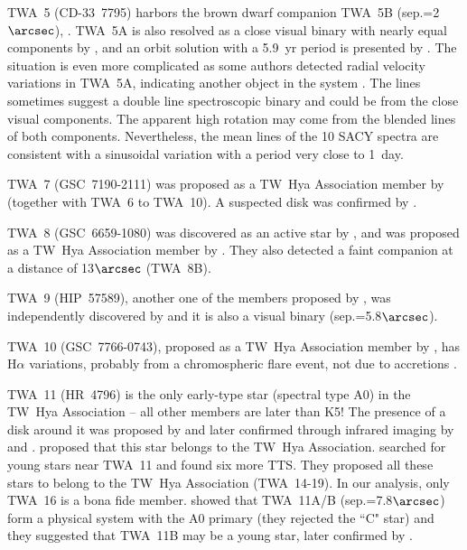 \documentclass[11pt,twoside]{book}
\begin{document}
TWA~5 (CD-33~7795) harbors
the brown dwarf companion  TWA~5B (sep.=2$\arcsec$), \citep{lowrance99, webb99}.
TWA~5A is also resolved as a close visual binary with nearly equal components by
\citet{mac00}, and an orbit solution with a 5.9~yr period is presented by \citet{kono07}.
The situation is even more complicated as some authors detected radial velocity
variations in TWA~5A, indicating another object in the system  \citep[see][]{torresg03}.
The lines sometimes suggest a double line spectroscopic binary
\citep[see][]{reid03} and could be from the close visual components.
The apparent high rotation may come from the blended lines of both components.
Nevertheless, the mean lines of the 10 SACY spectra are consistent with a
sinusoidal variation with a period
very close to 1~day.


TWA~7 (GSC~7190-2111) was proposed as a TW~Hya Association member by \citet{webb99}
(together with TWA~6 to TWA~10).
A suspected disk \citep{zuckerman01d,low05} was confirmed by \citet{matthews07}.

TWA~8 (GSC~6659-1080) was discovered as an active star by
 \citet{fleming98}, and was proposed as a TW~Hya Association member by
 \citet{webb99}. They also detected a
 faint companion at a distance of 13$\arcsec$ (TWA~8B).

TWA~9 (HIP~57589), another one of the members proposed by \citet{webb99}, was
independently discovered by \citet{jensen98}
and it is also a visual binary (sep.=5.8$\arcsec$).

TWA~10 (GSC~7766-0743), proposed as a TW~Hya Association member by
\citet{webb99}, has H$\alpha$ variations, probably from a chromospheric flare
event, not due to accretions \citep{Ray06}.

TWA~11 (HR~4796) is the only early-type star (spectral type A0) in  the TW~Hya
Association -- all other members are later than K5!
The presence of a disk around it  was proposed by \citet{jura93} and later confirmed
through infrared imaging by \citet{koerner98} and \citet{ray98}.
\citet{webb99} proposed that this star belongs to  the TW~Hya Association.
\citet{zuckerman01c} searched for young stars near TWA~11 and found six more TTS.
They proposed all these stars to belong to  the TW~Hya Association (TWA~14-19).
In our analysis, only TWA~16 is a bona fide member.
\citet{jura93} showed that TWA~11A/B (sep.=7.8$\arcsec$) form a physical
system with the A0 primary (they rejected the ``C" star) and  they suggested
that TWA~11B may be a young star, later confirmed by \citet{stauffer95}.
\end{document}
